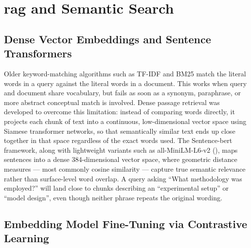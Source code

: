 \section{\gls{rag} and Semantic Search}

\subsection{Dense Vector Embeddings and Sentence Transformers}

Older keyword-matching algorithms such as TF-IDF and BM25 match the literal words in a query against the literal words in a document. This works when query and document share vocabulary, but fails as soon as a synonym, paraphrase, or more abstract conceptual match is involved. Dense passage retrieval was developed to overcome this limitation: instead of comparing words directly, it projects each chunk of text into a continuous, low-dimensional vector space using Siamese transformer networks, so that semantically similar text ends up close together in that space regardless of the exact words used.
\newline \newline The Sentence-\gls{bert} framework, along with lightweight variants such as all-MiniLM-L6-v2 (\citep{reimers2019sentence}), maps sentences into a dense 384-dimensional vector space, where geometric distance measures — most commonly cosine similarity — capture true semantic relevance rather than surface-level word overlap. A query asking “What methodology was employed?” will land close to chunks describing an “experimental setup” or “model design”, even though neither phrase repeats the original wording.

\subsection{Embedding Model Fine-Tuning via Contrastive Learning}

